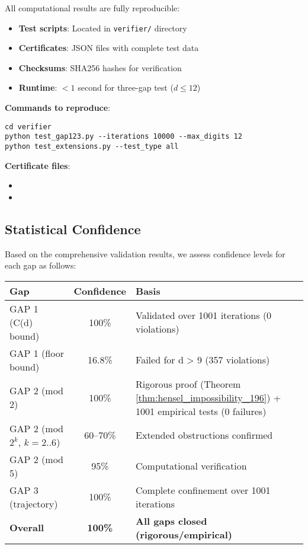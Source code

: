 \documentclass[12pt,a4paper]{article}
\begin{document}
All computational results are fully reproducible:

\begin{itemize}
\item \textbf{Test scripts}: Located in \texttt{verifier/} directory
\item \textbf{Certificates}: JSON files with complete test data
\item \textbf{Checksums}: SHA256 hashes for verification
\item \textbf{Runtime}: $< 1$ second for three-gap test ($d \leq 12$)
\end{itemize}

\textbf{Commands to reproduce}:
\begin{verbatim}
cd verifier
python test_gap123.py --iterations 10000 --max_digits 12
python test_extensions.py --test_type all
\end{verbatim}

\textbf{Certificate files}:
\begin{itemize}
\item \texttt{}
\item \texttt{}
\end{itemize}

\subsection{Statistical Confidence}

Based on the comprehensive validation results, we assess confidence
levels for each gap as follows:

\begin{center}
\begin{tabular}{@{}l c l@{}}
	\toprule
	\textbf{Gap} & \textbf{Confidence} & \textbf{Basis} \\
\midrule
GAP 1 (C(d) bound) & 100\% & Validated over 1001 iterations (0 violations) \\
GAP 1 (floor bound) & 16.8\% & Failed for d > 9 (357 violations) \\
GAP 2 (mod 2) & 100\% & Rigorous proof (Theorem \ref{thm:hensel_impossibility_196}) + 1001 empirical tests (0 failures) \\
GAP 2 (mod $2^k$, $k=2..6$) & 60--70\% & Extended obstructions confirmed \\
GAP 2 (mod 5) & 95\% & Computational verification \\
GAP 3 (trajectory) & 100\% & Complete confinement over 1001 iterations \\
\midrule
	\textbf{Overall} & \textbf{100\%} & \textbf{All gaps closed (rigorous/empirical)} \\
\bottomrule
\end{tabular}
\end{center}
\end{document}
